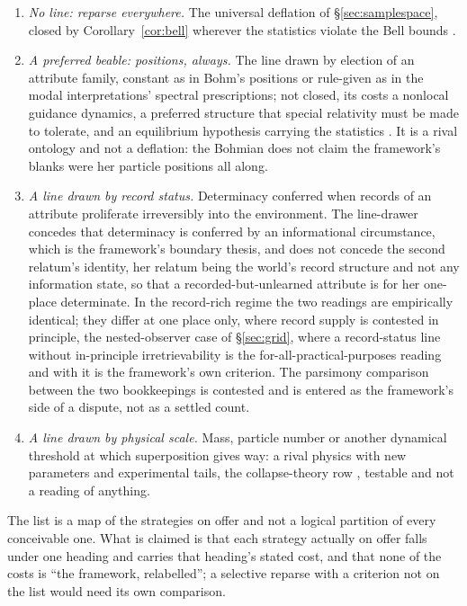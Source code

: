 \begin{enumerate}
\item \emph{No line: reparse everywhere.} The universal deflation of \S\ref{sec:samplespace}, closed by Corollary~\ref{cor:bell} wherever the statistics violate the Bell bounds \cite{fine1982hidden, pitowsky1994george}.
\item \emph{A preferred beable: positions, always.} The line drawn by election of an attribute family, constant as in Bohm's positions or rule-given as in the modal interpretations' spectral prescriptions; not closed, its costs a nonlocal guidance dynamics, a preferred structure that special relativity must be made to tolerate, and an equilibrium hypothesis carrying the statistics \cite{bohm1952suggested}. It is a rival ontology and not a deflation: the Bohmian does not claim the framework's blanks were her particle positions all along.
\item \emph{A line drawn by record status.} Determinacy conferred when records of an attribute proliferate irreversibly into the environment. The line-drawer concedes that determinacy is conferred by an informational circumstance, which is the framework's boundary thesis, and does not concede the second relatum's identity, her relatum being the world's record structure and not any information state, so that a recorded-but-unlearned attribute is for her one-place determinate. In the record-rich regime the two readings are empirically identical; they differ at one place only, where record supply is contested in principle, the nested-observer case of \S\ref{sec:grid}, where a record-status line without in-principle irretrievability is the for-all-practical-purposes reading and with it is the framework's own criterion. The parsimony comparison between the two bookkeepings is contested and is entered as the framework's side of a dispute, not as a settled count.
\item \emph{A line drawn by physical scale.} Mass, particle number or another dynamical threshold at which superposition gives way: a rival physics with new parameters and experimental tails, the collapse-theory row \cite{ghirardi1986unified}, testable and not a reading of anything.
\end{enumerate}

The list is a map of the strategies on offer and not a logical partition of every conceivable one. What is claimed is that each strategy actually on offer falls under one heading and carries that heading's stated cost, and that none of the costs is ``the framework, relabelled''; a selective reparse with a criterion not on the list would need its own comparison.

